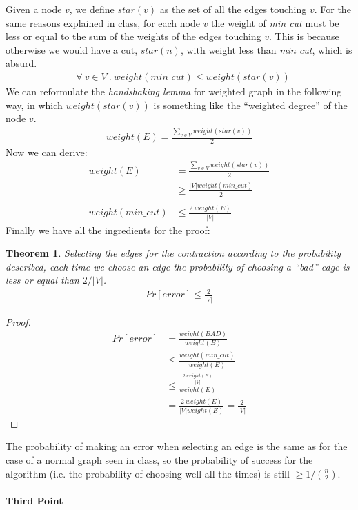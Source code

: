 \documentclass[a4paper]{article}
\newtheorem{theorem}{Theorem}
\begin{document}
Given a node $v$, we define $star(v)$ as the set of all the edges touching $v$.
For the same reasons explained in class, for each node $v$ the weight of \textit{min cut} must be less or equal to the sum of the weights of the edges touching $v$.
This is because otherwise we would have a cut, $star(n)$, with weight less than \textit{min cut}, which is absurd.
\begin{align*}
&\forall\ v \in V\ .\ weight(min\_cut) \leq weight(star(v)) \tag{3}
\end{align*}
We can reformulate the \textit{handshaking lemma} for weighted graph in the following way, in which $weight(star(v))$ is something like the ``weighted degree'' of the node $v$.
\begin{align*}
weight(E) = \frac{\sum_{v \in V} weight(star(v))}{2} \tag{4}
\end{align*}
Now we can derive:
\begin{align*}
weight(E) &= \frac{\sum_{v \in V} weight(star(v))}{2} \tag{from 4}\\
&\geq \frac{\vert V \vert weight(min\_cut)}{2} \tag{from 3}\\ \\
weight(min\_cut) &\leq \frac{2\ weight(E)}{\vert V \vert} \tag{5}
\end{align*}
Finally we have all the ingredients for the proof:
\begin{theorem}
Selecting the edges for the contraction according to the probability described, each time we choose an edge the probability of choosing a ``bad'' edge is less or equal than $2 / \vert V \vert$.
\begin{align*}
Pr[error] \leq \frac{2}{\vert V \vert}
\end{align*}
\end{theorem}
\begin{proof}
\begin{align*}
Pr[error] &= \frac{weight(BAD)}{weight(E)} \tag{from 1}\\
&\leq \frac{weight(min\_cut)}{weight(E)} \tag{from 2}\\
&\leq \frac{\frac{2\ weight(E)}{\vert V \vert}}{weight(E)} \tag{from 5}\\
&= \frac{2\ weight(E)}{\vert V \vert weight(E)} = \frac{2}{\vert V \vert}
\end{align*}
\end{proof}
The probability of making an error when selecting an edge is the same as for the case of a normal graph seen in class, so the probability of success for the algorithm (i.e. the probability of choosing well all the times) is still $\geq 1/ \binom{n}{2}$.
\\
\\
\noindent
\textbf{Third Point}
\\
\end{document}
